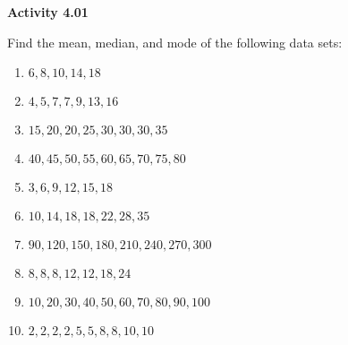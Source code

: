 \vspace{0.3ex}
\noindent\textbf{Activity 4.01}

\vspace{0.2ex}

Find the mean, median, and mode of the following data sets:  

\begin{enumerate}
    \item \( 6, 8, 10, 14, 18 \)
    \item \( 4, 5, 7, 7, 9, 13, 16 \)
    \item \( 15, 20, 20, 25, 30, 30, 30, 35 \)
    \item \( 40, 45, 50, 55, 60, 65, 70, 75, 80 \)
    \item \( 3, 6, 9, 12, 15, 18 \)
    \item \( 10, 14, 18, 18, 22, 28, 35 \)
    \item \( 90, 120, 150, 180, 210, 240, 270, 300 \)
    \item \( 8, 8, 8, 12, 12, 18, 24 \)
    \item \( 10, 20, 30, 40, 50, 60, 70, 80, 90, 100 \)
    \item \( 2, 2, 2, 2, 5, 5, 8, 8, 10, 10 \)
\end{enumerate}

